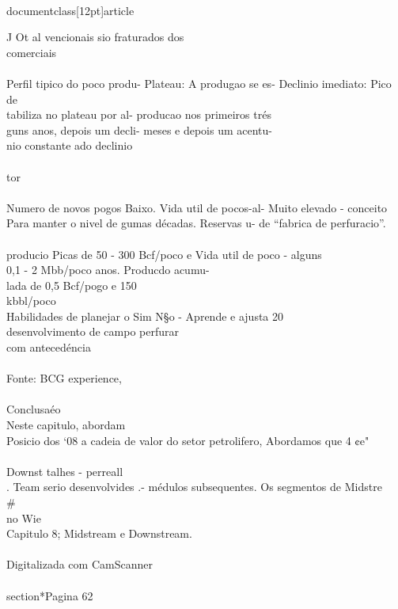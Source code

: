 \\documentclass[12pt]{article}
\begin{document}
J Ot al vencionais sio fraturados dos\\
comerciais\\
\\
Perfil tipico do poco produ- Plateau: A produgao se es- Declinio imediato: Pico de\\
tabiliza no plateau por al- producao nos primeiros trés\\
guns anos, depois um decli- meses e depois um acentu-\\
nio constante ado declinio\\
\\
tor\\
\\
Numero de novos pogos Baixo. Vida util de pocos-al- Muito elevado - conceito\\
Para manter o nivel de gumas décadas. Reservas u- de “fabrica de perfuracio”.\\
\\
producio Picas de 50 - 300 Bcf/poco e Vida util de poco - alguns\\
0,1 - 2 Mbb/poco anos. Producdo acumu-\\
lada de 0,5 Bcf/pogo e 150\\
kbbl/poco\\
Habilidades de planejar o Sim N§o - Aprende e ajusta 20\\
desenvolvimento de campo perfurar\\
com antecedéncia\\
\\
Fonte: BCG experience,\\
\\
Conclusaéo\\
Neste capitulo, abordam\\
Posicio dos ‘08 a cadeia de valor do setor petrolifero, Abordamos que 4 ¢e"\\
\\
Downst talhes - perreall\\
. Team serio desenvolvides .- médulos subsequentes. Os segmentos de Midstre\\#\\
no Wie\\
Capitulo 8; Midstream e Downstream.\\
\\
Digitalizada com CamScanner\\

\\section*{Pagina 62}
\end{document}
